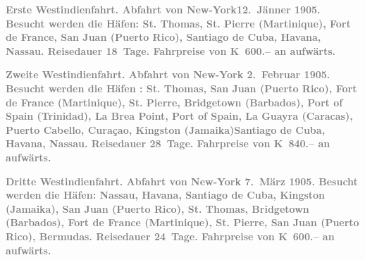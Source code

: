 \pstart
           \textcolor{gray}{\textbf{\textbf{Erste Westindienfahrt.} Abfahrt von New-York\textbf{12. Jänner 1905}. Besucht werden die Häfen: St. Thomas,
                     St. Pierre (Martinique), Fort de France, San Juan
                     (Puerto Rico), Santiago de Cuba, Havana, Nassau. Reisedauer 18 Tage. Fahrpreise von \textbf{K 600.–}
                  an aufwärts.}}\pend
           
\pstart
           \textcolor{gray}{\textbf{\textbf{Zweite Westindienfahrt.} Abfahrt von New-York { }\textbf{2. Februar 1905}. Besucht werden die Häfen : St.
                  Thomas, San Juan (Puerto Rico), Fort de France (Martinique), St. Pierre, Bridgetown
                     (Barbados), Port of Spain
                  (Trinidad), La Brea Point, Port of Spain, La Guayra (Caracas), Puerto Cabello, Curaçao, Kingston (Jamaika)Santiago de Cuba, Havana, Nassau.
                  Reisedauer 28 Tage. Fahrpreise von \textbf{K 840.–} an aufwärts.}}\pend
           
\pstart
           \textcolor{gray}{\textbf{\textbf{Dritte Westindienfahrt.} Abfahrt von New-York { }\textbf{7. März 1905}. Besucht werden die Häfen: Nassau, Havana, Santiago de Cuba, Kingston
                     (Jamaika), San Juan (Puerto Rico),
                     St. Thomas, Bridgetown (Barbados), Fort de France (Martinique), St.
                     Pierre, San Juan (Puerto Rico), Bermudas. Reisedauer 24 Tage. Fahrpreise von
                     \textbf{K 600.–} an aufwärts.}}\pend
           
